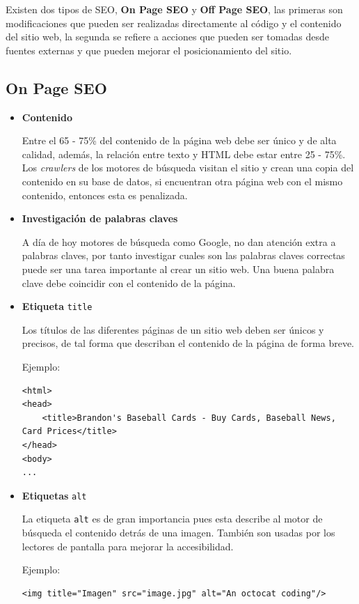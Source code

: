 \documentclass[12pt]{llncs}
\begin{document}
Existen dos tipos de SEO, \textbf{On Page SEO} y \textbf{Off Page SEO}, las primeras son modificaciones que pueden ser realizadas directamente al código y el contenido del sitio web, la segunda se refiere a acciones que pueden ser tomadas desde fuentes externas y que pueden mejorar el posicionamiento del sitio.

\subsection{On Page SEO}

\begin{itemize}
\item \textbf{Contenido}

Entre el 65 - 75\% del contenido de la página web debe ser único y de alta calidad, además, la relación entre texto y HTML debe estar entre 25 - 75\%. Los \textit{crawlers} de los motores de búsqueda visitan el sitio y crean una copia del contenido en su base de datos, si encuentran otra página web con el mismo contenido, entonces esta es penalizada.

\item \textbf{Investigación de palabras claves}

A día de hoy motores de búsqueda como Google, no dan atención extra a palabras claves, por tanto investigar cuales son las palabras claves correctas puede ser una tarea importante al crear un sitio web. Una buena palabra clave debe coincidir con el contenido de la página.

\item \textbf{Etiqueta} \verb+title+

Los títulos de las diferentes páginas de un sitio web deben ser únicos y precisos, de tal forma que describan el contenido de la página de forma breve.

Ejemplo:
\begin{lstlisting}
<html>
<head>
    <title>Brandon's Baseball Cards - Buy Cards, Baseball News, Card Prices</title>
</head>
<body>
...
\end{lstlisting}

\item \textbf{Etiquetas} \verb+alt+

La etiqueta \verb+alt+ es de gran importancia pues esta describe al motor de búsqueda el contenido detrás de una imagen. También son usadas por los lectores de pantalla para mejorar la accesibilidad.

Ejemplo:
\begin{lstlisting}
<img title="Imagen" src="image.jpg" alt="An octocat coding"/>    
\end{lstlisting}


\end{itemize}
\end{document}
